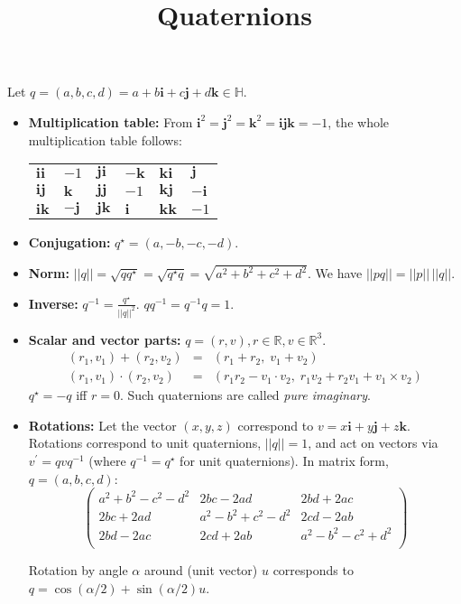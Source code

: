 \documentclass[a4paper]{article}
\title{Quaternions}
\author{}
\date{}
\begin{document}
\maketitle
Let $q = (a,b,c,d) = a + b\mathbf{i} + c\mathbf{j} + d\mathbf{k} \in \mathbb{H}$.
\begin{itemize}
\item\textbf{Multiplication table:} From $\mathbf{i}^2 = \mathbf{j}^2 = \mathbf{k}^2 = \mathbf{i}\mathbf{j}\mathbf{k} = -1$, the whole multiplication table follows:

\begin{tabular}{l@{$\;=\;$}ll@{$\;=\;$}ll@{$\;=\;$}l}
$\mathbf{i}\mathbf{i}$ & $-1$ &
$\mathbf{j}\mathbf{i}$ & $-\mathbf{k}$ &
$\mathbf{k}\mathbf{i}$ & $\mathbf{j}$\\
$\mathbf{i}\mathbf{j}$ & $\mathbf{k}$ &
$\mathbf{j}\mathbf{j}$ & $-1$ &
$\mathbf{k}\mathbf{j}$ & $-\mathbf{i}$\\
$\mathbf{i}\mathbf{k}$ & $-\mathbf{j}$ &
$\mathbf{j}\mathbf{k}$ & $\mathbf{i}$ &
$\mathbf{k}\mathbf{k}$ & $-1$\\
\end{tabular}

\item\textbf{Conjugation:} $q^\star = (a, -b, -c, -d)$.

\item\textbf{Norm:} $||q|| = \sqrt{q q^\star} = \sqrt{q^\star q} = \sqrt{a^2 + b^2 + c^2 + d^2}$. We have $||p q|| = ||p||\,||q||$.

\item\textbf{Inverse:} $q^{-1} = \frac{q^\star}{||q||^2}$. $q q^{-1} = q^{-1} q = 1$.

\item\textbf{Scalar and vector parts:} $q = (r, v), r \in \mathbb{R}, v \in \mathbb{R}^3$.
\begin{eqnarray*}
(r_1, v_1) + (r_2, v_2) &=& (r_1 + r_2,\; v_1 + v_2)\\
(r_1, v_1) \cdot (r_2, v_2) &=& (r_1 r_2 - v_1 \cdot v_2,\; r_1 v_2 + r_2 v_1 + v_1 \times v_2)
\end{eqnarray*}
$q^\star = -q$ iff $r = 0$. Such quaternions are called \textit{pure imaginary}.

\item\textbf{Rotations:} Let the vector $(x, y, z)$ correspond to $v = x\mathbf{i} + y\mathbf{j} + z\mathbf{k}$. Rotations correspond to unit quaternions, $||q|| = 1$, and act on vectors via $v^\prime = q v q^{-1}$ (where $q^{-1} = q^\star$ for unit quaternions). In matrix form, $q = (a,b,c,d)$:
\begin{displaymath}
\left(\begin{array}{ccc}
a^2+b^2-c^2-d^2 & 2bc-2ad         & 2bd+2ac        \\
2bc+2ad         & a^2-b^2+c^2-d^2 & 2cd-2ab        \\
2bd-2ac         & 2cd+2ab         & a^2-b^2-c^2+d^2\\
\end{array}\right)
\end{displaymath}

Rotation by angle $\alpha$ around (unit vector) $u$ corresponds to $q = \cos(\alpha/2) + \sin(\alpha/2) u$.

\end{itemize}
\end{document}
